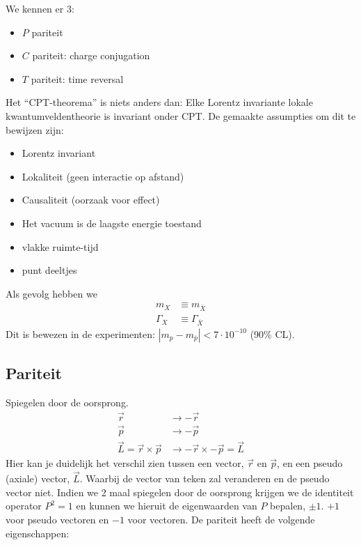 \documentclass[../main.tex]{subfiles}
\begin{document}
We kennen er 3:
\begin{itemize}
    \item $P$ pariteit
    \item $C$ pariteit: charge conjugation
    \item $T$ pariteit: time reversal
\end{itemize}
Het ``CPT-theorema'' is niets anders dan: Elke Lorentz invariante lokale kwantumveldentheorie is invariant onder CPT. De gemaakte assumpties om dit te bewijzen zijn:
\begin{itemize}
    \item Lorentz invariant
    \item Lokaliteit (geen interactie op afstand)
    \item Causaliteit (oorzaak voor effect)
    \item Het vacuum is de laagste energie toestand
    \item vlakke ruimte-tijd
    \item punt deeltjes
\end{itemize}
Als gevolg hebben we
\begin{equation}
    \begin{aligned}
        \label{eq:CPT_gevolgen}
        m_X&\equiv m_{\overline X}\\
        \Gamma_X&\equiv \Gamma_{\overline X}
    \end{aligned}
\end{equation}
Dit is bewezen in de experimenten: $|m_p-m_{\overline p}|<7\cdot10^{-10}$ (90\% CL).

\subsection{Pariteit}%
\label{sub:pariteit}

Spiegelen door de oorsprong.
\begin{equation}
    \begin{aligned}
        \label{eq:pariteit}
        \vec{r}&\rightarrow -\vec{r}\\
        \vec{p}&\rightarrow -\vec{p}\\
        \vec{L} = \vec{r}\times\vec{p}&\rightarrow -\vec{r} \times -\vec{p} = \vec{L}
    \end{aligned}
\end{equation}
Hier kan je duidelijk het verschil zien tussen een vector, $\vec{r}$ en $\vec{p}$, en een pseudo (axiale) vector, $\vec{L}$. Waarbij de vector van teken zal veranderen en de pseudo vector niet. Indien we 2 maal spiegelen door de oorsprong krijgen we de identiteit operator $P^2=1$ en kunnen we hieruit de eigenwaarden van $P$ bepalen, $\pm1$. $+1$ voor pseudo vectoren en $-1$ voor vectoren. De pariteit heeft de volgende eigenschappen:
\end{document}
